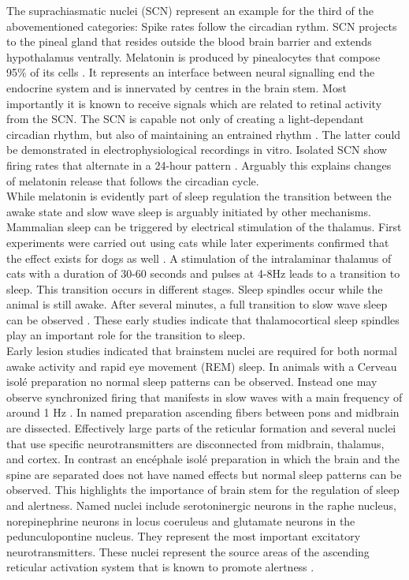 The suprachiasmatic nuclei (SCN) represent an example for the third of the abovementioned categories: Spike rates follow the circadian rythm. SCN projects to the pineal gland that resides outside the blood brain barrier and extends hypothalamus ventrally. Melatonin is produced by pinealocytes that compose 95\% of its cells \parencite{aulinas2019physiology}. It represents an interface between neural signalling end the endocrine system and is innervated by centres in the brain stem. Most importantly it is known to receive signals which are related to retinal activity from the SCN. The SCN is capable not only of creating a light-dependant circadian rhythm, but also of maintaining an entrained rhythm \parencite{koella1984organization}. The latter could be demonstrated in electrophysiological recordings in vitro. Isolated SCN show firing rates that alternate in a 24-hour pattern \parencite{de2011melatonergic}. Arguably this explains changes of melatonin release that follows the circadian cycle.\\
While melatonin is evidently part of sleep regulation the transition between the awake state and slow wave sleep is arguably initiated by other mechanisms. Mammalian sleep can be triggered by electrical stimulation of the thalamus. First experiments were carried out using cats while later experiments confirmed that the effect exists for dogs as well \parencite{akert1951sleep, akimoto1956sleep}. A stimulation of the intralaminar thalamus of cats with a duration of 30-60 seconds and pulses at 4-8Hz leads to a transition to sleep. This transition occurs in different stages. Sleep spindles occur while the animal is still awake. After several minutes, a full transition to slow wave sleep can be observed \parencite{akert1951sleep}. These early studies indicate that thalamocortical sleep spindles play an important role for the transition to sleep.\\
Early lesion studies indicated that brainstem nuclei are required for both normal awake activity and rapid eye movement (REM) sleep. In animals with a Cerveau isolé preparation no normal sleep patterns can be observed. Instead one may observe synchronized firing that manifests in slow waves with a main frequency of around 1 Hz \parencite{kawamura1968hippocampal}. In named preparation ascending fibers between pons and midbrain are dissected. Effectively large parts of the reticular formation and several nuclei that use specific neurotransmitters are disconnected from midbrain, thalamus, and cortex. In contrast an encéphale isolé preparation in which the brain and the spine are separated does not have named effects but normal sleep patterns can be observed. This highlights the importance of brain stem for the regulation of sleep and alertness. Named nuclei include serotoninergic neurons in the raphe nucleus, norepinephrine neurons in locus coeruleus and glutamate neurons in the pedunculopontine nucleus. They represent the most important excitatory neurotransmitters. These nuclei represent the source areas of the ascending reticular activation system that is known to promote alertness \parencite{brown2012control}.\\
